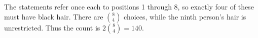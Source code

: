 The statements refer once each to positions 1 through 8, so exactly four of these must have black hair. There are $\binom84 $ choices, while the ninth person's hair is unrestricted. Thus the count is $ 2\binom84=\boxed{140}$.
